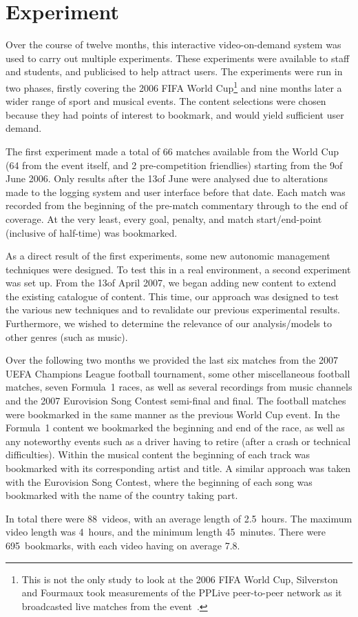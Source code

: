 
\section{Experiment}
\label{sect:experiment}
    Over the course of twelve months, this interactive video-on-demand system was used to carry out multiple experiments. These experiments were available to staff and students, and publicised to help attract users. The experiments were run in two phases, firstly covering the 2006 FIFA World Cup\footnote{This is not the only study to look at the 2006 FIFA World Cup, Silverston and Fourmaux took measurements of the PPLive peer-to-peer network as it broadcasted live matches from the event~\cite{silverston2007mpi}.} and nine months later a wider range of sport and musical events. The content selections were chosen because they had points of interest to bookmark, and would yield sufficient user demand.

    The first experiment made a total of 66 matches available from the World Cup (64 from the event itself, and 2 pre-competition friendlies) starting from the 9\sth of June 2006. Only results after the 13\sth of June were analysed due to alterations made to the logging system and user interface before that date. Each match was recorded from the beginning of the pre-match commentary through to the end of coverage. At the very least, every goal, penalty, and match start/end-point (inclusive of half-time) was bookmarked.

    As a direct result of the first experiments, some new autonomic management techniques were designed. To test this in a real environment, a second experiment was set up. From the 13\sth of April 2007, we began adding new content to extend the existing catalogue of content. This time, our approach was designed to test the various new techniques and to revalidate our previous experimental results. Furthermore, we wished to determine the relevance of our analysis/models to other genres (such as music).

    Over the following two months we provided the last six matches from the 2007 UEFA Champions League football tournament, some other miscellaneous football matches, seven Formula~1 races, as well as several recordings from music channels and the 2007 Eurovision Song Contest semi-final and final. The football matches were bookmarked in the same manner as the previous World Cup event. In the Formula~1 content we bookmarked the beginning and end of the race, as well as any noteworthy events such as a driver having to retire (after a crash or technical difficulties). Within the musical content the beginning of each track was bookmarked with its corresponding artist and title. A similar approach was taken with the Eurovision Song Contest, where the beginning of each song was bookmarked with the name of the country taking part.

    In total there were 88~videos, with an average length of 2.5~hours. The maximum video length was 4~hours, and the minimum length 45~minutes. There were 695~bookmarks, with each video having on average 7.8. 